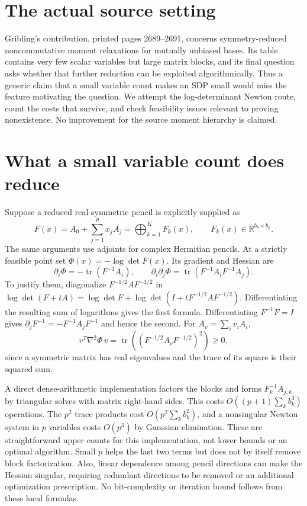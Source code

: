 \documentclass[11pt]{article}
\begin{document}
\section{The actual source setting}
Gribling's contribution, printed pages 2689--2691, concerns
symmetry-reduced noncommutative moment relaxations for mutually
unbiased bases. Its table contains very few scalar variables but
large matrix blocks, and its final question asks whether that
further reduction can be exploited algorithmically. Thus a generic
claim that a small variable count makes an SDP small would miss
the feature motivating the question. We attempt the log-determinant
Newton route, count the costs that survive, and check feasibility
issues relevant to proving nonexistence. No improvement for the
source moment hierarchy is claimed.

\section{What a small variable count does reduce}
Suppose a reduced real symmetric pencil is explicitly supplied as
\[
 F(x)=A_0+\sum_{j=1}^p x_jA_j
       =\bigoplus_{k=1}^K F_k(x),\qquad F_k(x)\in\mathbb R^{b_k\times b_k}.
\]
The same arguments use adjoints for complex Hermitian pencils.
At a strictly feasible point set $\Phi(x)=-\log\det F(x)$.
Its gradient and Hessian are
\[
 \partial_i\Phi=-\operatorname{tr}(F^{-1}A_i),\qquad
 \partial_i\partial_j\Phi=
 \operatorname{tr}(F^{-1}A_iF^{-1}A_j).
\]
To justify them, diagonalize
$F^{-1/2}AF^{-1/2}$ in
$\log\det(F+tA)=\log\det F+\log\det(I+tF^{-1/2}AF^{-1/2})$.
Differentiating the resulting sum of logarithms gives the first
formula. Differentiating $F^{-1}F=I$ gives
$\partial_jF^{-1}=-F^{-1}A_jF^{-1}$ and hence the second.
For $A_v=\sum_i v_iA_i$,
\[
 v^T\nabla^2\Phi\,v
 =\operatorname{tr}((F^{-1/2}A_vF^{-1/2})^2)\ge0,
\]
since a symmetric matrix has real eigenvalues and the trace of
its square is their squared sum.

A direct dense-arithmetic implementation factors the blocks and
forms $F_k^{-1}A_{j,k}$ by triangular solves with matrix right-hand
sides. This costs
$O((p+1)\sum_k b_k^3)$ operations. The $p^2$ trace products
cost $O(p^2\sum_k b_k^2)$, and a nonsingular Newton system in
$p$ variables costs $O(p^3)$ by Gaussian elimination. These are
straightforward upper counts for this implementation, not lower
bounds or an optimal algorithm. Small $p$ helps the last two
terms but does not by itself remove block factorization. Also,
linear dependence among pencil directions can make the Hessian
singular, requiring redundant directions to be removed or an
additional optimization prescription. No bit-complexity or
iteration bound follows from these local formulas.
\end{document}
